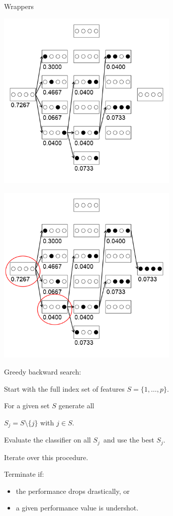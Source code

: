 \begin{vbframe}{Wrappers}
\framebreak

\begin{center}
\includegraphics[width = 0.65\textwidth]{figure_man/wrapperanim5.png}
\end{center}

\framebreak

\begin{center}
\includegraphics[width = 0.65\textwidth]{figure_man/wrapperanim6.png}
\end{center}

\framebreak

\begin{blocki}{Greedy backward search:}
  \item Start with the full index set of features $S = \{1, \ldots, p\}$.
  \item For a given set $S$ generate all

  $S_j = S \setminus\{j\}$ with $j \in S$.
  \item Evaluate the classifier on all $S_j$\
    and use the best $S_j$.
  \item Iterate over this procedure.
  \item Terminate if:
    \begin{itemize}
      \item the performance drops drastically, or
      \item a given performance value is undershot.
    \end{itemize}
  \end{blocki}


\end{vbframe}
